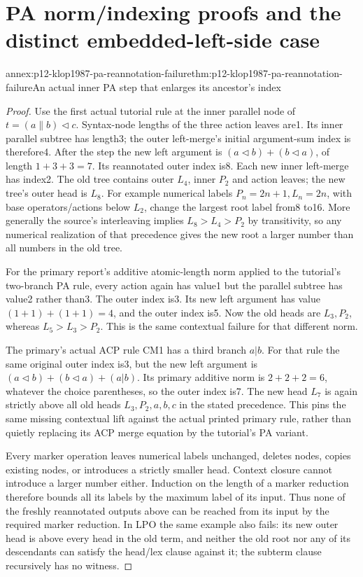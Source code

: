 \section{PA norm/indexing proofs and the distinct embedded-left-side case}

\begin{annexitem}{annex:p12-klop1987-pa-reannotation-failure}{thm:p12-klop1987-pa-reannotation-failure}{An actual inner PA step that enlarges its ancestor's index}
\begin{proof}
Use the first actual tutorial rule at the inner parallel node of
\(t=(a\parallel b)\lhd c\). Syntax-node lengths of the three
action leaves are1. Its inner parallel subtree has length3;
the outer left-merge's initial argument-sum index is therefore4.
After the step the new left argument is
\((a\lhd b)+(b\lhd a)\), of length \(1+3+3=7\).
Its reannotated outer index is8. Each new inner left-merge has
index2. The old tree contains outer \(L_4\), inner \(P_2\)
and action leaves; the new tree's outer head is \(L_8\).
For example numerical labels \(P_n=2n+1,L_n=2n\), with
base operators/actions below \(L_2\), change the largest root
label from8 to16. More generally the source's interleaving implies
\(L_8>L_4>P_2\) by transitivity, so any numerical realization
of that precedence gives the new root a larger number than all
numbers in the old tree.

For the primary report's additive atomic-length norm applied to
the tutorial's two-branch PA rule, every action again has value1
but the parallel subtree has value2 rather than3. The outer index
is3. Its new left argument has value
\((1+1)+(1+1)=4\), and the outer index is5. Now the old heads
are \(L_3,P_2\), whereas \(L_5>L_3>P_2\).
This is the same contextual failure for that different norm.

The primary's actual ACP rule CM1 has a third branch \(a|b\).
For that rule the same original outer index is3, but the new left
argument is \((a\lhd b)+(b\lhd a)+(a|b)\). Its primary
additive norm is \(2+2+2=6\), whatever the choice parentheses,
so the outer index is7. The new head \(L_7\) is again strictly
above all old heads \(L_3,P_2,a,b,c\) in the stated precedence.
This pins the same missing contextual lift against the actual
printed primary rule, rather than quietly replacing its ACP
merge equation by the tutorial's PA variant.

Every marker operation leaves numerical labels unchanged, deletes
nodes, copies existing nodes, or introduces a strictly smaller
head. Context closure cannot introduce a larger number either.
Induction on the length of a marker reduction therefore bounds
all its labels by the maximum label of its input. Thus none of the
freshly reannotated outputs above can be reached from its input by
the required marker reduction. In LPO the same example also fails:
its new outer head is above every head in the old term, and neither
the old root nor any of its descendants can satisfy the head/lex
clause against it; the subterm clause recursively has no witness.


\end{proof}
\end{annexitem}
